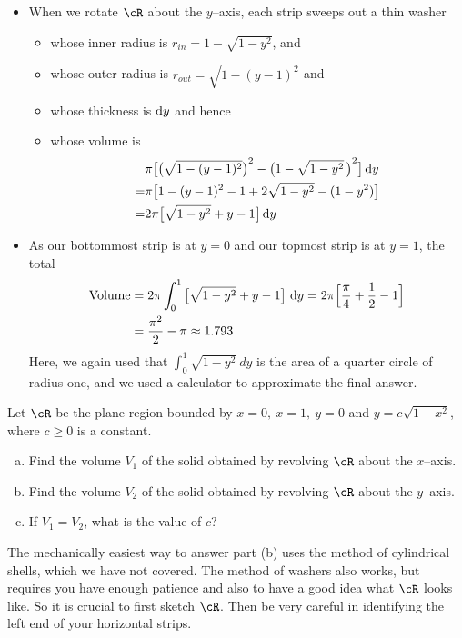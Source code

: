 \begin{solution}
\begin{itemize}
\item When we rotate $\cR$ about the $y$--axis,  each strip
sweeps out a thin washer
\begin{itemize}
\item
whose inner radius is $r_{in}=1-\sqrt{1-y^2}$, and
\item
whose outer radius is $r_{out}= \sqrt{1-(y-1)^2}$ and
\item
whose thickness is $\mathrm{d}y$ and hence
\item
whose volume is
\begin{align*}
&\pi\big[{\big(\sqrt{1-(y-1)^2}\big)}^2-{\big(1-\sqrt{1-y^2}\,\big)}^2\big]\,\mathrm{d}y\\
=&\pi \big[  1 - (y-1)^2       -1 + 2\sqrt{1-y^2} - (1-y^2)   \big]\\
=&2\pi\big[\sqrt{1-y^2}+y-1\big]\,\mathrm{d}y\end{align*}

\end{itemize}
\item As our bottommost strip is at $y=0$ and our topmost
strip is at $y=1$, the total
\begin{align*}
{\rm Volume} &= 2\pi\int_{0}^1\big[\sqrt{1-y^2}+y-1\big]\ \mathrm{d}y
= 2\pi\Big[\frac{\pi}{4}+\frac{1}{2}-1\Big]\\
&=\frac{\pi^2}{2}-\pi\approx 1.793
\end{align*}
Here, we again used that $\int_{0}^1 \sqrt{1-y^2}\ dy$ is the area of a quarter
circle of radius one, and we used a calculator to approximate the final answer.
\end{itemize}

\end{solution}

\begin{Mquestion}[1997A]
Let $\cR$ be the plane region bounded by $x=0,\ x=1,\ y=0$
and $y=c\sqrt{1+x^2}$, where $c\ge 0$ is a constant.
\begin{enumerate}[(a)]
\item
Find the volume $V_1$ of the solid obtained by revolving
$\cR$ about the $x$--axis.
\item
Find the volume $V_2$ of the solid obtained by revolving
$\cR$ about the $y$--axis.
\item
 If $V_1=V_2$, what is the value of $c$?
\end{enumerate}
\end{Mquestion}

\begin{hint}
The mechanically easiest way to answer part (b) uses the method of cylindrical
shells, which we have not covered.  The method of washers also works, but requires  you have enough patience and also
to have a good idea what $\cR$ looks like. So it is crucial to first sketch $\cR$.
Then be very careful in identifying the left end of your horizontal strips.
\end{hint}

